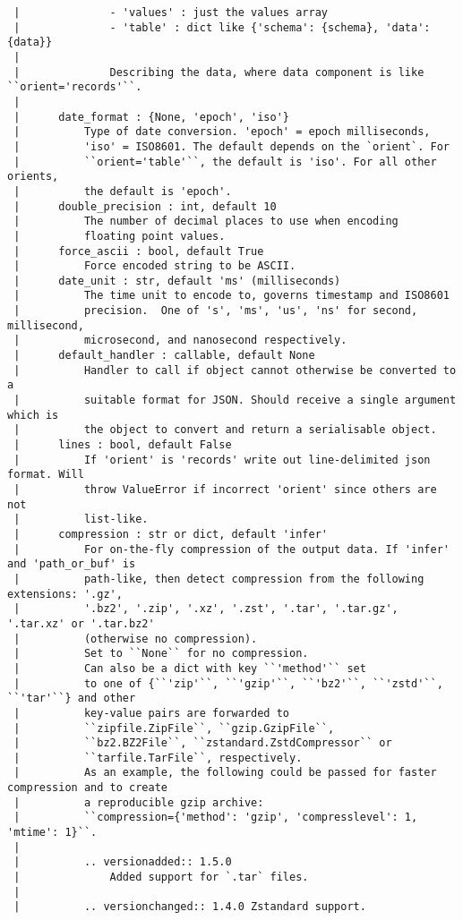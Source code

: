 \documentclass[
  letterpaper,
  DIV=11,
  numbers=noendperiod]{scrreprt}
\begin{document}
\begin{verbatim}
 |              - 'values' : just the values array
 |              - 'table' : dict like {'schema': {schema}, 'data': {data}}
 |      
 |              Describing the data, where data component is like ``orient='records'``.
 |      
 |      date_format : {None, 'epoch', 'iso'}
 |          Type of date conversion. 'epoch' = epoch milliseconds,
 |          'iso' = ISO8601. The default depends on the `orient`. For
 |          ``orient='table'``, the default is 'iso'. For all other orients,
 |          the default is 'epoch'.
 |      double_precision : int, default 10
 |          The number of decimal places to use when encoding
 |          floating point values.
 |      force_ascii : bool, default True
 |          Force encoded string to be ASCII.
 |      date_unit : str, default 'ms' (milliseconds)
 |          The time unit to encode to, governs timestamp and ISO8601
 |          precision.  One of 's', 'ms', 'us', 'ns' for second, millisecond,
 |          microsecond, and nanosecond respectively.
 |      default_handler : callable, default None
 |          Handler to call if object cannot otherwise be converted to a
 |          suitable format for JSON. Should receive a single argument which is
 |          the object to convert and return a serialisable object.
 |      lines : bool, default False
 |          If 'orient' is 'records' write out line-delimited json format. Will
 |          throw ValueError if incorrect 'orient' since others are not
 |          list-like.
 |      compression : str or dict, default 'infer'
 |          For on-the-fly compression of the output data. If 'infer' and 'path_or_buf' is
 |          path-like, then detect compression from the following extensions: '.gz',
 |          '.bz2', '.zip', '.xz', '.zst', '.tar', '.tar.gz', '.tar.xz' or '.tar.bz2'
 |          (otherwise no compression).
 |          Set to ``None`` for no compression.
 |          Can also be a dict with key ``'method'`` set
 |          to one of {``'zip'``, ``'gzip'``, ``'bz2'``, ``'zstd'``, ``'tar'``} and other
 |          key-value pairs are forwarded to
 |          ``zipfile.ZipFile``, ``gzip.GzipFile``,
 |          ``bz2.BZ2File``, ``zstandard.ZstdCompressor`` or
 |          ``tarfile.TarFile``, respectively.
 |          As an example, the following could be passed for faster compression and to create
 |          a reproducible gzip archive:
 |          ``compression={'method': 'gzip', 'compresslevel': 1, 'mtime': 1}``.
 |      
 |          .. versionadded:: 1.5.0
 |              Added support for `.tar` files.
 |      
 |          .. versionchanged:: 1.4.0 Zstandard support.

\end{verbatim}
\end{document}
